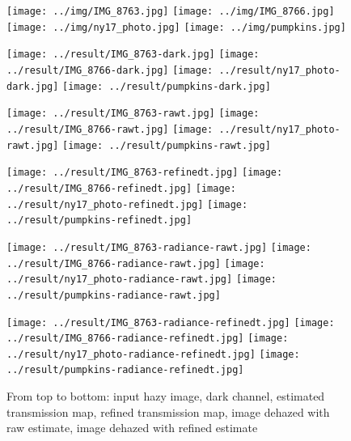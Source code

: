 \documentclass{article}
\begin{document}
\begin{figure}[H]
    \centering
    \begin{minipage}[b]{\linewidth}
        \centering
        \texttt{[image: ../img/IMG\_8763.jpg]}
        \texttt{[image: ../img/IMG\_8766.jpg]}
        \texttt{[image: ../img/ny17\_photo.jpg]}
        \texttt{[image: ../img/pumpkins.jpg]}
    \end{minipage}
    \begin{minipage}[b]{\linewidth}
        \centering
        \texttt{[image: ../result/IMG\_8763-dark.jpg]}
        \texttt{[image: ../result/IMG\_8766-dark.jpg]}
        \texttt{[image: ../result/ny17\_photo-dark.jpg]}
        \texttt{[image: ../result/pumpkins-dark.jpg]}
    \end{minipage}
    \begin{minipage}[b]{\linewidth}
        \centering
        \texttt{[image: ../result/IMG\_8763-rawt.jpg]}
        \texttt{[image: ../result/IMG\_8766-rawt.jpg]}
        \texttt{[image: ../result/ny17\_photo-rawt.jpg]}
        \texttt{[image: ../result/pumpkins-rawt.jpg]}
    \end{minipage}
    \begin{minipage}[b]{\linewidth}
        \centering
        \texttt{[image: ../result/IMG\_8763-refinedt.jpg]}
        \texttt{[image: ../result/IMG\_8766-refinedt.jpg]}
        \texttt{[image: ../result/ny17\_photo-refinedt.jpg]}
        \texttt{[image: ../result/pumpkins-refinedt.jpg]}
    \end{minipage}
    \begin{minipage}[b]{\linewidth}
        \centering
        \texttt{[image: ../result/IMG\_8763-radiance-rawt.jpg]}
        \texttt{[image: ../result/IMG\_8766-radiance-rawt.jpg]}
        \texttt{[image: ../result/ny17\_photo-radiance-rawt.jpg]}
        \texttt{[image: ../result/pumpkins-radiance-rawt.jpg]}
    \end{minipage}
    \begin{minipage}[b]{\linewidth}
        \centering
        \texttt{[image: ../result/IMG\_8763-radiance-refinedt.jpg]}
        \texttt{[image: ../result/IMG\_8766-radiance-refinedt.jpg]}
        \texttt{[image: ../result/ny17\_photo-radiance-refinedt.jpg]}
        \texttt{[image: ../result/pumpkins-radiance-refinedt.jpg]}
    \end{minipage}
    \caption{From top to bottom: input hazy image, dark channel, estimated transmission map, refined transmission map, image dehazed with raw estimate, image dehazed with refined estimate}
    \label{fig:result2}
\end{figure}
\end{document}
